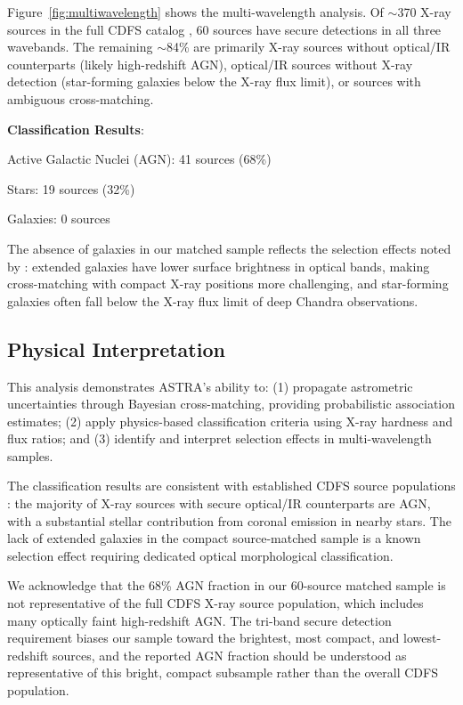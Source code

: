 \documentclass[usenatbib]{rasti}
\begin{document}
Figure~\ref{fig:multiwavelength} shows the multi-wavelength analysis. Of $\sim$370 X-ray sources in the full CDFS catalog \citep{alexander2003}, 60 sources have secure detections in all three wavebands. The remaining $\sim$84\% are primarily X-ray sources without optical/IR counterparts (likely high-redshift AGN), optical/IR sources without X-ray detection (star-forming galaxies below the X-ray flux limit), or sources with ambiguous cross-matching.

\textbf{Classification Results}:
\begin{description}
\item Active Galactic Nuclei (AGN): 41 sources (68\%)
\item Stars: 19 sources (32\%)
\item Galaxies: 0 sources
\end{description}

The absence of galaxies in our matched sample reflects the selection effects noted by \citet{bauer2004}: extended galaxies have lower surface brightness in optical bands, making cross-matching with compact X-ray positions more challenging, and star-forming galaxies often fall below the X-ray flux limit of deep Chandra observations.

\subsection{Physical Interpretation}

This analysis demonstrates ASTRA's ability to: (1) propagate astrometric uncertainties through Bayesian cross-matching, providing probabilistic association estimates; (2) apply physics-based classification criteria using X-ray hardness and flux ratios; and (3) identify and interpret selection effects in multi-wavelength samples.

The classification results are consistent with established CDFS source populations \citep{alexander2003,bauer2004}: the majority of X-ray sources with secure optical/IR counterparts are AGN, with a substantial stellar contribution from coronal emission in nearby stars. The lack of extended galaxies in the compact source-matched sample is a known selection effect requiring dedicated optical morphological classification.

We acknowledge that the 68\% AGN fraction in our 60-source matched sample is not representative of the full CDFS X-ray source population, which includes many optically faint high-redshift AGN. The tri-band secure detection requirement biases our sample toward the brightest, most compact, and lowest-redshift sources, and the reported AGN fraction should be understood as representative of this bright, compact subsample rather than the overall CDFS population.
\end{document}
